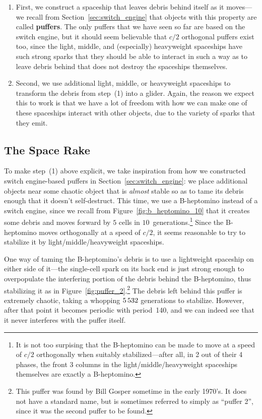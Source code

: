 \begin{enumerate}
	\item[1)] First, we construct a spaceship that leaves debris behind itself as it moves---we recall from Section~\ref{sec:switch_engine} that objects with this property are called \textbf{puffers}. The only puffers that we have seen so far are based on the switch engine, but it should seem believable that $c/2$ orthogonal puffers exist too, since the light, middle, and (especially) heavyweight spaceships have such strong sparks that they should be able to interact in such a way as to leave debris behind that does not destroy the spaceships themselves.\smallskip
	
	\item[2)] Second, we use additional light, middle, or heavyweight spaceships to transform the debris from step~(1) into a glider. Again, the reason we expect this to work is that we have a lot of freedom with how we can make one of these spaceships interact with other objects, due to the variety of sparks that they emit.
\end{enumerate}


\subsection{The Space Rake}\label{sec:space_rake}

To make step~(1) above explicit, we take inspiration from how we constructed switch engine-based puffers in Section~\ref{sec:switch_engine}: we place additional objects near some chaotic object that is \emph{almost} stable so as to tame its debris enough that it doesn't self-destruct. This time, we use a B-heptomino instead of a switch engine, since we recall from Figure~\ref{fig:b_heptomino_10} that it creates some debris and moves forward by $5$ cells in $10$~generations.\footnote{It is not too surpising that the B-heptomino can be made to move at a speed of $c/2$ orthogonally when suitably stabilized---after all, in 2 out of their 4 phases, the front 3 columns in the light/middle/heavyweight spaceships themselves are exactly a B-heptomino.} Since the B-heptomino moves orthogonally at a speed of $c/2$, it seems reasonable to try to stabilize it by light/middle/heavyweight spaceships.

One way of taming the B-heptomino's debris is to use a lightweight spaceship on either side of it---the single-cell spark on its back end is just strong enough to overpopulate the interfering portion of the debris behind the B-heptomino, thus stabilizing it as in Figure~\ref{fig:puffer_2}.\footnote{This puffer was found by Bill Gosper sometime in the early 1970's. It does not have a standard name, but is sometimes referred to simply as ``puffer 2'', since it was the second puffer to be found.} The debris left behind this puffer is extremely chaotic, taking a whopping $5{\,}532$ generations to stabilize. However, after that point it becomes periodic with period~140, and we can indeed see that it never interferes with the puffer itself.

